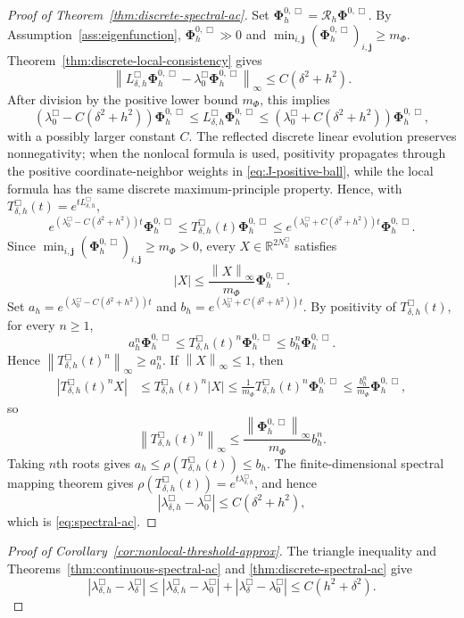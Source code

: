 \documentclass[11pt]{article}
\theoremstyle{definition}
\newcommand{\R}{\mathbb{R}}
\newcommand{\cR}{\mathcal{R}}
\newcommand{\norm}[1]{\left\lVert #1\right\rVert}
\newcommand{\PhiV}{\bm\Phi}
\newcommand{\jj}{\bm j}
\begin{document}
\begin{proof}[Proof of Theorem~\ref{thm:discrete-spectral-ac}]
Set $\PhiV_h^{0,\Box}=\cR_h\PhiV^{0,\Box}$.  By Assumption~\ref{ass:eigenfunction}, $\PhiV_h^{0,\Box}\gg0$ and $\min_{i,\jj}(\PhiV_h^{0,\Box})_{i,\jj}\ge m_\Phi$.
Theorem~\ref{thm:discrete-local-consistency} gives
\[
 \left\|
 L_{\delta,h}^{\Box}\PhiV_h^{0,\Box}
 -\lambda_0^{\Box}\PhiV_h^{0,\Box}
 \right\|_\infty
 \le C(\delta^2+h^2).
\]
After division by the positive lower bound $m_\Phi$, this implies
\[
 (\lambda_0^{\Box}-C(\delta^2+h^2))\PhiV_h^{0,\Box}
 \le
 L_{\delta,h}^{\Box}\PhiV_h^{0,\Box}
 \le
 (\lambda_0^{\Box}+C(\delta^2+h^2))\PhiV_h^{0,\Box},
\]
with a possibly larger constant $C$.  The reflected discrete linear
evolution preserves nonnegativity; when the nonlocal formula is used,
positivity propagates through the positive coordinate-neighbor weights
in \eqref{eq:J-positive-ball}, while the local formula has the same
discrete maximum-principle property.  Hence, with
$T_{\delta,h}^{\Box}(t)=e^{tL_{\delta,h}^{\Box}}$,
\[
 e^{(\lambda_0^{\Box}-C(\delta^2+h^2))t}\PhiV_h^{0,\Box}
 \le
 T_{\delta,h}^{\Box}(t)\PhiV_h^{0,\Box}
 \le
 e^{(\lambda_0^{\Box}+C(\delta^2+h^2))t}\PhiV_h^{0,\Box}.
\]
Since $\min_{i,\jj}(\PhiV_h^{0,\Box})_{i,\jj}\ge m_\Phi>0$, every $X\in\R^{2N_h^{\Box}}$ satisfies
\[
 |X|
 \le
 \frac{\norm{X}_\infty}{m_\Phi}\PhiV_h^{0,\Box}.
\]
Set $a_h=e^{(\lambda_0^{\Box}-C(\delta^2+h^2))t}$ and $b_h=e^{(\lambda_0^{\Box}+C(\delta^2+h^2))t}$.  By positivity of $T_{\delta,h}^{\Box}(t)$, for every $n\ge1$,
\[
 a_h^n\PhiV_h^{0,\Box}
 \le
 T_{\delta,h}^{\Box}(t)^n\PhiV_h^{0,\Box}
 \le
 b_h^n\PhiV_h^{0,\Box}.
\]
Hence $\norm{T_{\delta,h}^{\Box}(t)^n}_\infty\ge a_h^n$.  If $\norm{X}_\infty\le1$, then
\[
 \begin{aligned}
 |T_{\delta,h}^{\Box}(t)^nX|
 &\le
 T_{\delta,h}^{\Box}(t)^n|X|\le
 \frac{1}{m_\Phi}
 T_{\delta,h}^{\Box}(t)^n\PhiV_h^{0,\Box}\le
 \frac{b_h^n}{m_\Phi}\PhiV_h^{0,\Box},
 \end{aligned}
\]
so
\[
 \norm{T_{\delta,h}^{\Box}(t)^n}_\infty
 \le
 \frac{\norm{\PhiV_h^{0,\Box}}_\infty}{m_\Phi}b_h^n.
\]
Taking $n$th roots gives $a_h\le\rho(T_{\delta,h}^{\Box}(t))\le b_h$.  The finite-dimensional spectral mapping theorem gives $\rho(T_{\delta,h}^{\Box}(t))=e^{t\lambda_{\delta,h}^{\Box}}$, and hence
\[
 |\lambda_{\delta,h}^{\Box}-\lambda_0^{\Box}|
 \le C(\delta^2+h^2),
\]
which is \eqref{eq:spectral-ac}.
\end{proof}

\begin{proof}[Proof of Corollary~\ref{cor:nonlocal-threshold-approx}]
The triangle inequality and Theorems~\ref{thm:continuous-spectral-ac} and \ref{thm:discrete-spectral-ac} give
\[
 |\lambda_{\delta,h}^{\Box}-\lambda_\delta^{\Box}|
 \le
 |\lambda_{\delta,h}^{\Box}-\lambda_0^{\Box}|
 +
 |\lambda_\delta^{\Box}-\lambda_0^{\Box}|
 \le
 C(h^2+\delta^2).
\]
\end{proof}
\end{document}
